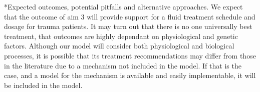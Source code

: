 \documentclass[11pt]{article}
\makeatletter
\renewcommand\paragraph{\@startsection
  {paragraph}{2}{0mm}
  {-0.05in}
  {-0.5\baselineskip}
  {\normalfont\normalsize\itshape}}
\makeatother
\begin{document}
\paragraph*{Expected outcomes, potential pitfalls and alternative approaches.}
We expect that the outcome of aim 3 will provide support for a fluid treatment schedule and dosage for trauma patients. It may turn out that there is no one universally best treatment, that outcomes are highly dependant on physiological and genetic factors. Although our model will consider both physiological and biological processes, it is possible that its treatment recommendations may differ from those in the literature due to a mechanism not included in the model. If that is the case, and a model for the mechanism is available and easily implementable, it will be included in the model. 
\end{document}
